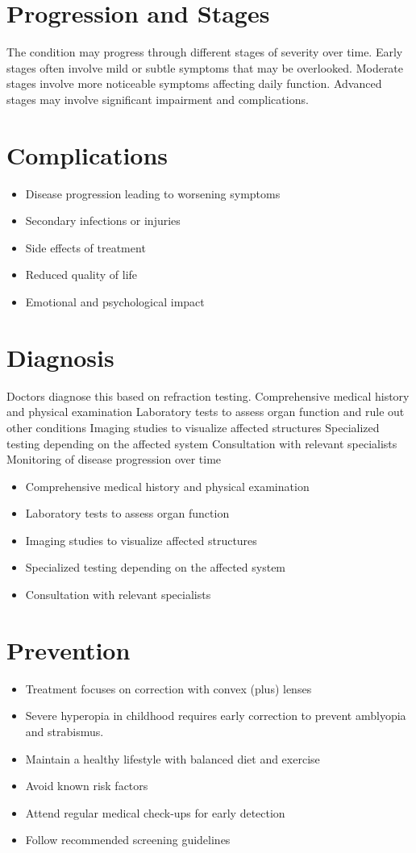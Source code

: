 \section{Progression and Stages}
The condition may progress through different stages of severity over time. Early stages often involve mild or subtle symptoms that may be overlooked. Moderate stages involve more noticeable symptoms affecting daily function. Advanced stages may involve significant impairment and complications.
\section{Complications}
\begin{itemize}[noitemsep]
  \item Disease progression leading to worsening symptoms
  \item Secondary infections or injuries
  \item Side effects of treatment
  \item Reduced quality of life
  \item Emotional and psychological impact
\end{itemize}
\section{Diagnosis}
Doctors diagnose this based on refraction testing. Comprehensive medical history and physical examination Laboratory tests to assess organ function and rule out other conditions Imaging studies to visualize affected structures Specialized testing depending on the affected system Consultation with relevant specialists Monitoring of disease progression over time

\begin{itemize}[noitemsep]
  \item Comprehensive medical history and physical examination
  \item Laboratory tests to assess organ function
  \item Imaging studies to visualize affected structures
  \item Specialized testing depending on the affected system
  \item Consultation with relevant specialists
\end{itemize}
\section{Prevention}
\begin{itemize}[noitemsep]
  \item Treatment focuses on correction with convex (plus) lenses
  \item Severe hyperopia in childhood requires early correction to prevent amblyopia and strabismus.
  \item Maintain a healthy lifestyle with balanced diet and exercise
  \item Avoid known risk factors
  \item Attend regular medical check-ups for early detection
  \item Follow recommended screening guidelines
\end{itemize}
